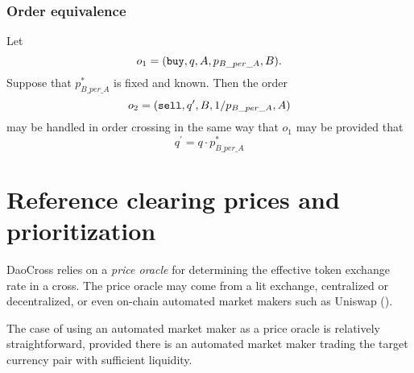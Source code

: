 \documentclass[11pt, reqno]{amsart}
\newcommand{\buy}{\textnormal{\texttt{buy}}}
\newcommand{\sell}{\textnormal{\texttt{sell}}}
\begin{document}
\subsubsection{Order equivalence}
Let
\[
    o_1 = (\buy, q, A, p_{B\_per\_A}, B).
\]
Suppose that $p^*_{B\_per\_A}$ is fixed and known. Then the order
\[
    o_2 = (\sell, q^\prime, B, 1 / p_{B\_per\_A}, A)
\]
may be handled in order crossing in the same way that $o_1$ may be
provided that
\[
    q^\prime = q \cdot p^*_{B\_per\_A}
\]

%
%
%

%
%


\section{Reference clearing prices and prioritization}
DaoCross relies on a \emph{price oracle} for determining the effective
token exchange rate in a cross. The price oracle may come from a lit
exchange, centralized or decentralized, or even on-chain automated market
makers such as Uniswap (\cite[\S 2.2]{AdZiRo20}).

The case of using an automated market maker as a price oracle is relatively
straightforward, provided there is an automated market maker trading the
target currency pair with sufficient liquidity.
\end{document}
